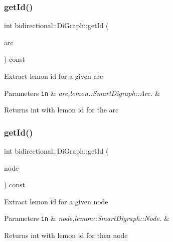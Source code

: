 \subsubsection{\texorpdfstring{get\+Id()}{getId()}\hspace{0.1cm}{\footnotesize\ttfamily [1/2]}}
{\footnotesize\ttfamily int bidirectional\+::\+Di\+Graph\+::get\+Id (\begin{DoxyParamCaption}\item[{const \hyperlink{digraph_8h_a0f10c67f03c054baec3e3bab6a92171e}{Lemon\+Arc} \&}]{arc }\end{DoxyParamCaption}) const\hspace{0.3cm}{\ttfamily [inline]}}

Extract lemon id for a given arc


\begin{DoxyParams}[1]{Parameters}
\mbox{\tt in}  & {\em arc,lemon\+::\+Smart\+Digraph\+::\+Arc.} & \\
\hline
\end{DoxyParams}
\begin{DoxyReturn}{Returns}
int with lemon id for the arc 
\end{DoxyReturn}
\mbox{\label{classbidirectional_1_1DiGraph_afb87bafec6ea1764bd19509f0b0ca4e9}} 
\subsubsection{\texorpdfstring{get\+Id()}{getId()}\hspace{0.1cm}{\footnotesize\ttfamily [2/2]}}
{\footnotesize\ttfamily int bidirectional\+::\+Di\+Graph\+::get\+Id (\begin{DoxyParamCaption}\item[{const \hyperlink{digraph_8h_a952c6b935f7521c3435dbd13b255246b}{Lemon\+Node} \&}]{node }\end{DoxyParamCaption}) const\hspace{0.3cm}{\ttfamily [inline]}}

Extract lemon id for a given node


\begin{DoxyParams}[1]{Parameters}
\mbox{\tt in}  & {\em node,lemon\+::\+Smart\+Digraph\+::\+Node.} & \\
\hline
\end{DoxyParams}
\begin{DoxyReturn}{Returns}
int with lemon id for then node 
\end{DoxyReturn}
\mbox{\label{classbidirectional_1_1DiGraph_a966eb000fda1f5dac268f8f4ae6b19cb}} 
